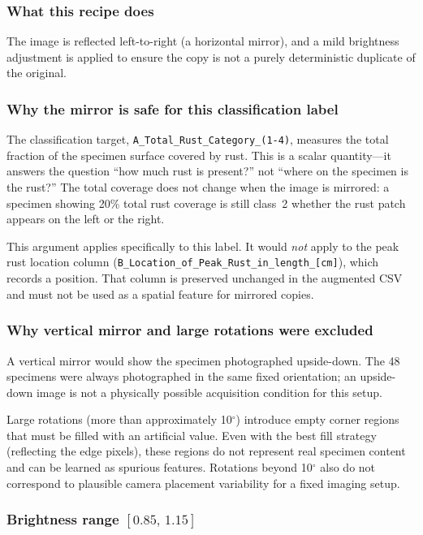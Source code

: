 \documentclass[11pt,a4paper]{article}
\begin{document}
\subsubsection*{What this recipe does}

The image is reflected left-to-right (a horizontal mirror), and a mild brightness adjustment is applied to ensure the copy is not a purely deterministic duplicate of the original.

\subsubsection*{Why the mirror is safe for this classification label}

The classification target, \texttt{A\_Total\_Rust\_Category\_(1-4)}, measures the total fraction of the specimen surface covered by rust. This is a scalar quantity---it answers the question ``how much rust is present?'' not ``where on the specimen is the rust?'' The total coverage does not change when the image is mirrored: a specimen showing 20\% total rust coverage is still class~2 whether the rust patch appears on the left or the right.

This argument applies specifically to this label. It would \emph{not} apply to the peak rust location column (\texttt{B\_Location\_of\_Peak\_Rust\_in\_length\_[cm]}), which records a position. That column is preserved unchanged in the augmented CSV and must not be used as a spatial feature for mirrored copies.

\subsubsection*{Why vertical mirror and large rotations were excluded}

A vertical mirror would show the specimen photographed upside-down. The 48 specimens were always photographed in the same fixed orientation; an upside-down image is not a physically possible acquisition condition for this setup.

Large rotations (more than approximately 10$^\circ$) introduce empty corner regions that must be filled with an artificial value. Even with the best fill strategy (reflecting the edge pixels), these regions do not represent real specimen content and can be learned as spurious features. Rotations beyond 10$^\circ$ also do not correspond to plausible camera placement variability for a fixed imaging setup.

\subsubsection*{Brightness range $[0.85,\,1.15]$}
\end{document}
